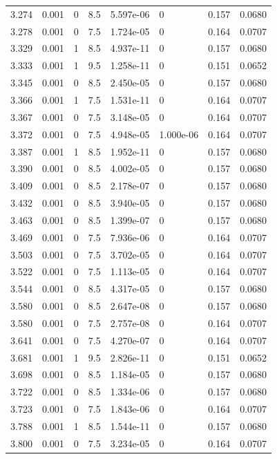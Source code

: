 \documentclass[preview]{standalone}
\begin{document}
{{{{\begin{tabular}{L{1.2cm}C{1.2cm} C{0.3cm}C{0.5cm} C{1.4cm}C{1.4cm} C{1.4cm}C{1.4cm}}
  3.274  &  0.001  & 0     & 8.5 &  5.597e-06  & 0  & 0.157 &  0.0680   \\ 
  3.278  &  0.001  & 0     & 7.5 &  1.724e-05  & 0  & 0.164 &  0.0707   \\ 
  3.329  &  0.001  & 1     & 8.5 &  4.937e-11  & 0  & 0.157 &  0.0680   \\ 
  3.333  &  0.001  & 1     & 9.5 &  1.258e-11  & 0  & 0.151 &  0.0652   \\ 
  3.345  &  0.001  & 0     & 8.5 &  2.450e-05  & 0  & 0.157 &  0.0680   \\ 
  3.366  &  0.001  & 1     & 7.5 &  1.531e-11  & 0  & 0.164 &  0.0707   \\ 
  3.367  &  0.001  & 0     & 7.5 &  3.148e-05  & 0  & 0.164 &  0.0707   \\ 
  3.372  &  0.001  & 0     & 7.5 &  4.948e-05  & 1.000e-06  & 0.164 &  0.0707   \\ 
  3.387  &  0.001  & 1     & 8.5 &  1.952e-11  & 0  & 0.157 &  0.0680   \\ 
  3.390  &  0.001  & 0     & 8.5 &  4.002e-05  & 0  & 0.157 &  0.0680   \\ 
  3.409  &  0.001  & 0     & 8.5 &  2.178e-07  & 0  & 0.157 &  0.0680   \\ 
  3.432  &  0.001  & 0     & 8.5 &  3.940e-05  & 0  & 0.157 &  0.0680   \\ 
  3.463  &  0.001  & 0     & 8.5 &  1.399e-07  & 0  & 0.157 &  0.0680   \\ 
  3.469  &  0.001  & 0     & 7.5 &  7.936e-06  & 0  & 0.164 &  0.0707   \\ 
  3.503  &  0.001  & 0     & 7.5 &  3.702e-05  & 0  & 0.164 &  0.0707   \\ 
  3.522  &  0.001  & 0     & 7.5 &  1.113e-05  & 0  & 0.164 &  0.0707   \\ 
  3.544  &  0.001  & 0     & 8.5 &  4.317e-05  & 0  & 0.157 &  0.0680   \\ 
  3.580  &  0.001  & 0     & 8.5 &  2.647e-08  & 0  & 0.157 &  0.0680   \\ 
  3.580  &  0.001  & 0     & 7.5 &  2.757e-08  & 0  & 0.164 &  0.0707   \\ 
  3.641  &  0.001  & 0     & 7.5 &  4.270e-07  & 0  & 0.164 &  0.0707   \\ 
  3.681  &  0.001  & 1     & 9.5 &  2.826e-11  & 0  & 0.151 &  0.0652   \\ 
  3.698  &  0.001  & 0     & 8.5 &  1.184e-05  & 0  & 0.157 &  0.0680   \\ 
  3.722  &  0.001  & 0     & 8.5 &  1.334e-06  & 0  & 0.157 &  0.0680   \\ 
  3.723  &  0.001  & 0     & 7.5 &  1.843e-06  & 0  & 0.164 &  0.0707   \\ 
  3.788  &  0.001  & 1     & 8.5 &  1.544e-11  & 0  & 0.157 &  0.0680   \\ 
  3.800  &  0.001  & 0     & 7.5 &  3.234e-05  & 0  & 0.164 &  0.0707   \\ 
\hline 
\end{tabular} 

}}}}
\end{document}

